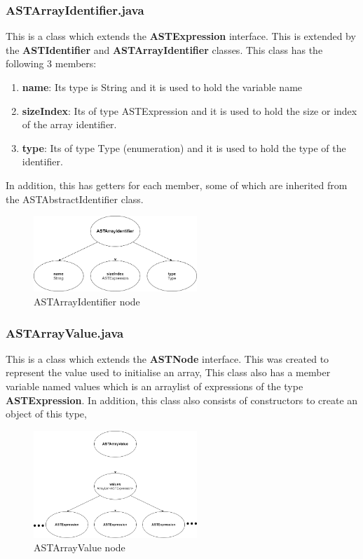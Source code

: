 \documentclass{article}
\begin{document}
							\subsubsection{ASTArrayIdentifier.java}
					
					This is a class which extends the \textbf{ASTExpression} interface. This is extended by the \textbf{ASTIdentifier} and \textbf{ASTArrayIdentifier} classes. This class has the following 3 members: 
					\begin{enumerate}
					\item \textbf{name}: Its type is String and it is used to hold the variable name
					\item \textbf{sizeIndex}: Its of type ASTExpression and it is used to hold the size or index of the array identifier.
					\item \textbf{type}: Its of type Type (enumeration) and it is used to hold the type of the identifier.
				
					\end{enumerate}
			In addition, this has getters for each member, some of which are inherited from the ASTAbstractIdentifier class.
					
								\begin{figure}[H]
					\centering
			 			\includegraphics[width=0.55\textwidth]{astarrayidentifier.png}
			  			\caption{ASTArrayIdentifier node}
			  			\label{fig:astarrayidentifier}
					\end{figure}
					
							\subsubsection{ASTArrayValue.java}
					
					This is a class which extends the \textbf{ASTNode} interface. This was created to represent the value used to initialise an array, This class also has a member variable named values which is an arraylist of expressions of the type \textbf{ASTExpression}. In addition, this class also consists of constructors to create an object of this type,
					
								\begin{figure}[H]
					\centering
			 			\includegraphics[width=0.55\textwidth]{astarrayvalue.png}
			  			\caption{ASTArrayValue node}
			  			\label{fig:astarrayvalue}
					\end{figure}					
					
\end{document}
